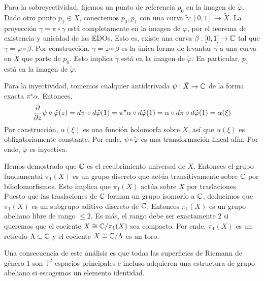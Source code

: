 \begin{solution}
Para la sobreyectividad, fijemos un punto de referencia $p_0$ en la imagen de $\tilde \varphi$. Dado otro punto $p_1 \in X$, conectemos $p_0, p_1$ con una curva $\tilde \gamma : [0,1] \to \tilde X$. La proyección $\gamma = \pi \circ \gamma$ está completamente en la imagen de $\varphi$, por el teorema de existencia y unicidad de las EDOs. Esto es, existe una curva $\beta : [0,1] \to \mathbb C$ tal que $\gamma = \varphi \circ \beta$. Por construcción, $\tilde \gamma = \tilde \varphi \circ \beta$ es la única forma de levantar $\gamma$ a una curva en $\tilde X$ que parte de $p_0$. Esto implica $\tilde \gamma$ está en la imagen de $\tilde \varphi$. En particular, $p_1$ está en la imagen de $\tilde \varphi$.

Para la inyectividad, tomemos cualquier antiderivada $\psi : \tilde X \to \mathbb C$ de la forma exacta $\pi^\star \alpha$. Entonces,
$$\frac {\partial } {\partial z} \psi \circ \tilde \varphi(z) = d\psi \circ d\tilde \varphi(1) = \pi^\star \alpha \circ d\tilde \varphi(1) = \alpha \circ d\pi \circ d\tilde \varphi(1) = \alpha(\xi)$$
Por construcción, $\alpha(\xi)$ es una función holomorfa sobre $X$, así que $\alpha(\xi)$ es obligatoriamente constante. Por ende, $\psi \circ \tilde \varphi$ es una transformación lineal afín. Por ende, $\tilde \varphi$ es inyectiva.

Hemos demostrado que $\mathbb C$ es el recubrimiento universal de $X$. Entonces el grupo fundamental $\pi_1(X)$ es un grupo discreto que actúa transitivamente sobre $\mathbb C$ por biholomorfismos. Esto implica que $\pi_1(X)$ actúa sobre $X$ por traslaciones. Puesto que las traslaciones de $\mathbb C$ forman un grupo isomorfo a $\mathbb C$, deducimos que $\pi_1(X)$ es un subgrupo aditivo discreto de $\mathbb C$. Entonces $\pi_1(X)$ es un grupo abeliano libre de rango $\le 2$. Es más, el rango debe ser exactamente $2$ si queremos que el cociente $X \cong \mathbb C / \pi_1(X)$ sea compacto. Por ende, $\pi_1(X)$ es un retículo $\Lambda \subset \mathbb C$ y el cociente $X \cong \mathbb C / \Lambda$ es un toro.

Una consecuencia de este análisis es que todas las superficies de Riemann de género $1$ son $\mathbb T^2$-espacios principales e incluso adquieren una estructura de grupo abeliano si escogemos un elemento identidad.
\end{solution}
